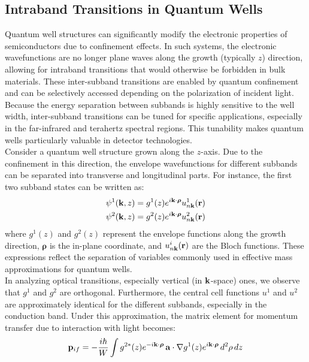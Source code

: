 \subsection{Intraband Transitions in Quantum Wells}
Quantum well structures can significantly modify the electronic properties of semiconductors due to confinement effects. In such systems, the electronic wavefunctions are no longer plane waves along the growth (typically \( z \)) direction, allowing for intraband transitions that would otherwise be forbidden in bulk materials. These inter-subband transitions are enabled by quantum confinement and can be selectively accessed depending on the polarization of incident light.\\
Because the energy separation between subbands is highly sensitive to the well width, inter-subband transitions can be tuned for specific applications, especially in the far-infrared and terahertz spectral regions. This tunability makes quantum wells particularly valuable in detector technologies.\\
Consider a quantum well structure grown along the \( z \)-axis. Due to the confinement in this direction, the envelope wavefunctions for different subbands can be separated into transverse and longitudinal parts. For instance, the first two subband states can be written as:
\begin{equation}
	\begin{aligned}
		\psi^1(\vb{k}, z) & = g^1(z) e^{i \vb{k} \cdot \boldsymbol{\rho}} u^1_{n\vb{k}}(\vb{r}) \\
		\psi^2(\vb{k}, z) & = g^2(z) e^{i \vb{k} \cdot \boldsymbol{\rho}} u^2_{n\vb{k}}(\vb{r})
	\end{aligned}
\end{equation}
where \( g^1(z) \) and \( g^2(z) \) represent the envelope functions along the growth direction, \( \boldsymbol{\rho} \) is the in-plane coordinate, and \( u^i_{n\vb{k}}(\vb{r}) \) are the Bloch functions. These expressions reflect the separation of variables commonly used in effective mass approximations for quantum wells.\\
In analyzing optical transitions, especially vertical (in \( \vb{k} \)-space) ones, we observe that \( g^1 \) and \( g^2 \) are orthogonal. Furthermore, the central cell functions \( u^1 \) and \( u^2 \) are approximately identical for the different subbands, especially in the conduction band. Under this approximation, the matrix element for momentum transfer due to interaction with light becomes:
\begin{equation}
	\vb{p}_{if} = -\frac{i \hbar}{W} \int g^{2*}(z) e^{-i \vb{k} \cdot \boldsymbol{\rho}} \, \vb{a} \cdot \nabla g^1(z) e^{i \vb{k} \cdot \boldsymbol{\rho}} \, d^2 \rho \, dz
\end{equation}
